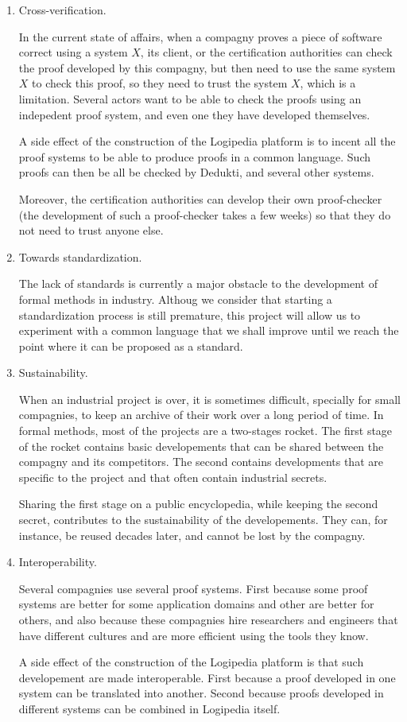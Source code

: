 \begin{enumerate}
\item Cross-verification.

In the current state of affairs, when a compagny proves a piece of
software correct using a system $X$, its client, or the certification
authorities can check the proof developed by this compagny, but then
need to use the same system $X$ to check this proof, so they need to
trust the system $X$, which is a limitation. Several actors want to be
able to check the proofs using an indepedent proof system, and even one
they have developed themselves.

A side effect of the construction of the {\sf Logipedia} platform is
to incent all the proof systems to be able to produce proofs in a
common language. Such proofs can then be all be checked by {\sf
Dedukti}, and several other systems.

Moreover, the certification authorities can develop their own
proof-checker (the development of such a proof-checker takes a few weeks) so that they do not need to trust anyone else.

\item Towards standardization.

The lack of standards is currently a major obstacle to the development
of formal methods in industry. Althoug we consider that starting a
standardization process is still premature, this project will allow us
to experiment with a common language that we shall improve until we
reach the point where it can be proposed as a standard.

\item Sustainability.

When an industrial project is over, it is sometimes difficult,
specially for small compagnies, to keep an archive of their work over
a long period of time. In formal methods, most of the projects are a
two-stages rocket. The first stage of the rocket contains basic
developements that can be shared between the compagny and its
competitors. The second contains developments that are specific to the
project and that often contain industrial secrets.

Sharing the first stage on a public encyclopedia, while keeping the
second secret, contributes to the sustainability of the
developements. They can, for instance, be reused decades later, and
cannot be lost by the compagny.

\item Interoperability.

Several compagnies use several proof systems. First because some proof
systems are better for some application domains and other are better
for others, and also because these compagnies hire researchers and
engineers that have different cultures and are more efficient using the
tools they know.

A side effect of the construction of the {\sf Logipedia} platform is
that such developement are made interoperable. First because a proof
developed in one system can be translated into another. Second because
proofs developed in different systems can be combined in {\sf
Logipedia} itself.
\end{enumerate}

